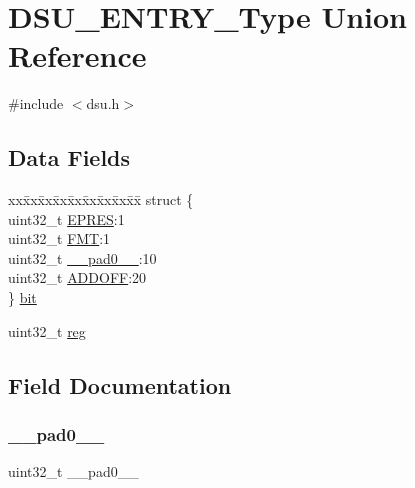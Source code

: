 \hypertarget{union_d_s_u___e_n_t_r_y___type}{}\section{D\+S\+U\+\_\+\+E\+N\+T\+R\+Y\+\_\+\+Type Union Reference}
\label{union_d_s_u___e_n_t_r_y___type}


{\ttfamily \#include $<$dsu.\+h$>$}

\subsection*{Data Fields}
\begin{DoxyCompactItemize}
\item 
\begin{tabbing}
xx\=xx\=xx\=xx\=xx\=xx\=xx\=xx\=xx\=\kill
struct \{\\
\>uint32\_t \mbox{\hyperlink{union_d_s_u___e_n_t_r_y___type_a0327e9070e0d0a28eaa35ab6c3bc013e}{EPRES}}:1\\
\>uint32\_t \mbox{\hyperlink{union_d_s_u___e_n_t_r_y___type_af0366b5197677d31db7bb05d8049ec01}{FMT}}:1\\
\>uint32\_t \mbox{\hyperlink{union_d_s_u___e_n_t_r_y___type_a3e57c2ef1c3ffb36722f000cc1156824}{\_\_pad0\_\_}}:10\\
\>uint32\_t \mbox{\hyperlink{union_d_s_u___e_n_t_r_y___type_ad6278bf12a3043ae4eab61592fb5186a}{ADDOFF}}:20\\
\} \mbox{\hyperlink{union_d_s_u___e_n_t_r_y___type_ae784f489c2276f2801e831128a64bc64}{bit}}\\

\end{tabbing}\item 
uint32\+\_\+t \mbox{\hyperlink{union_d_s_u___e_n_t_r_y___type_a6b91636401516a477989a336376d7b40}{reg}}
\end{DoxyCompactItemize}


\subsection{Field Documentation}
\mbox{\label{union_d_s_u___e_n_t_r_y___type_a3e57c2ef1c3ffb36722f000cc1156824}} 
\subsubsection{\texorpdfstring{\_\_pad0\_\_}{\_\_pad0\_\_}}
{\footnotesize\ttfamily uint32\+\_\+t \+\_\+\+\_\+pad0\+\_\+\+\_\+}

